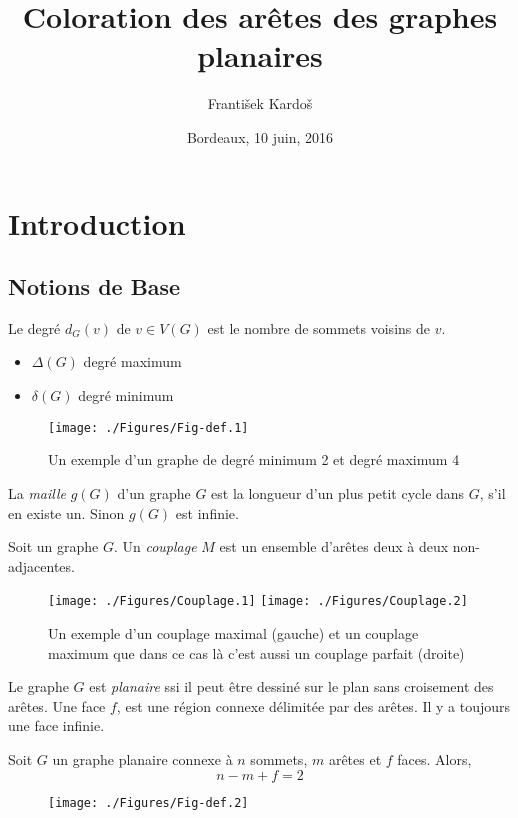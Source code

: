 \documentclass{beamer}
\title[Coloration des arêtes des graphes planaires]{Coloration des arêtes des graphes planaires}
\author[A. Gallastegui and F. Kardo\v s]{\underbar{Antonio Gallastegui} \and Franti\v sek Kardo\v s}
\institute[]{
Laboratoire Bordelais de Recherche Informatique \\
Université de Bordeaux\\
}
\date{Bordeaux, 10 juin, 2016}
\begin{document}
\begin{frame}
  \titlepage
\end{frame}
\section{Introduction}
\subsection{Notions de Base}
\begin{frame}
Le degré $d_G(v)$ de $v\in V(G)$ est le nombre de sommets voisins de $v$.
\begin{itemize}
\item $\Delta(G)$ degré maximum
\item $\delta(G)$ degré minimum
\end{itemize} 
\begin{figure}[ht]
\centerline{
\texttt{[image: ./Figures/Fig-def.1]}
}
\caption{Un exemple d'un graphe de degré minimum 2 et degré maximum 4}
\end{figure}


La \emph{maille} $g(G)$ d'un graphe $G$ est la longueur d'un plus petit cycle dans $G$, s'il en existe un. Sinon $g(G)$ est infinie.
\end{frame}

\begin{frame}
Soit un graphe $G$. Un \emph{couplage} $M$ est un ensemble d'arêtes deux à deux non-adjacentes.
\begin{figure}[ht]
\centerline{
\texttt{[image: ./Figures/Couplage.1]}
\hfil
\texttt{[image: ./Figures/Couplage.2]}
}
\caption{Un exemple d'un couplage maximal (gauche) et un couplage maximum que dans ce cas là c'est aussi un couplage parfait (droite)}

\end{figure}

\end{frame}

\begin{frame}
Le graphe $G$ est \emph{planaire} ssi il peut être dessiné sur le plan sans croisement des arêtes.
Une face $f$, est une région connexe délimitée par des arêtes. Il y a toujours une face infinie.
\pause
\begin{theorem}[Euler, 1750]
Soit $G$ un graphe planaire connexe à $n$ sommets, $m$ arêtes et $f$ faces. Alors,
$$
n-m+f=2
$$
\end{theorem}
\begin{figure}[ht]
\centerline{
\texttt{[image: ./Figures/Fig-def.2]}
}
\end{figure}
\end{frame}
\end{document}
